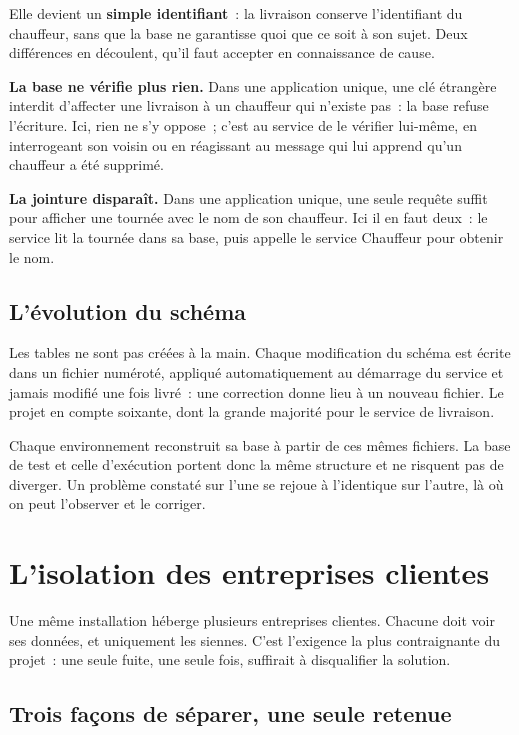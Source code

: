 Elle devient un \textbf{simple identifiant}~: la livraison conserve l'identifiant du chauffeur, sans
que la base ne garantisse quoi que ce soit à son sujet. Deux différences en découlent, qu'il faut
accepter en connaissance de cause.

\textbf{La base ne vérifie plus rien.} Dans une application unique, une clé étrangère interdit
d'affecter une livraison à un chauffeur qui n'existe pas~: la base refuse l'écriture. Ici, rien ne
s'y oppose~; c'est au service de le vérifier lui-même, en interrogeant son voisin ou en réagissant au
message qui lui apprend qu'un chauffeur a été supprimé.

\textbf{La jointure disparaît.} Dans une application unique, une seule requête suffit pour afficher
une tournée avec le nom de son chauffeur. Ici il en faut deux~: le service lit la tournée dans sa
base, puis appelle le service Chauffeur pour obtenir le nom.

\subsection{L'évolution du schéma}

Les tables ne sont pas créées à la main. Chaque modification du schéma est écrite dans un fichier
numéroté, appliqué automatiquement au démarrage du service et jamais modifié une fois livré~: une
correction donne lieu à un nouveau fichier. Le projet en compte soixante, dont la grande
majorité pour le service de livraison.

Chaque environnement reconstruit sa base à partir de ces mêmes fichiers. La base de test et celle
d'exécution portent donc la même structure et ne risquent pas de diverger. Un problème constaté sur
l'une se rejoue à l'identique sur l'autre, là où on peut l'observer et le corriger.

\section{L'isolation des entreprises clientes}
\label{sec:archi-tenance}

Une même installation héberge plusieurs entreprises clientes. Chacune doit voir ses données, et
uniquement les siennes. C'est l'exigence la plus contraignante du projet~: une seule fuite, une seule
fois, suffirait à disqualifier la solution.

\subsection{Trois façons de séparer, une seule retenue}

